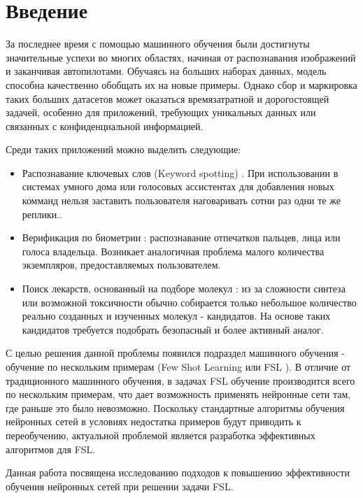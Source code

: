 \section{Введение}
\label{sec:Chapter0} 

\par
За последнее время с помощью машинного обучения были достигнуты значительные успехи во многих областях, начиная от распознавания изображений и заканчивая автопилотами.  Обучаясь на больших наборах данных, модель способна качественно обобщать их на новые примеры. Однако сбор и маркировка таких больших датасетов может оказаться времязатратной и дорогостоящей задачей, особенно для приложений, требующих уникальных данных или связанных с конфиденциальной информацией.

Среди таких приложений можно выделить следующие:
\begin{itemize}
    \item Распознавание ключевых слов (Keyword spotting) \cite{FSLKeywordSpotting}. При использовании в системах умного дома или голосовых ассистентах для добавления новых комманд нельзя заставить пользователя наговаривать сотни раз одни те же реплики..
    \item Верификация по биометрии \cite{FSLBiometricVerification}: распознавание отпечатков пальцев, лица или голоса владельца. Возникает аналогичная проблема малого количества экземпляров, предоставляемых пользователем.
    \item Поиск лекарств, основанный на подборе молекул \cite{FSLDrugDiscovery}: из за сложности синтеза или возможной токсичности обычно собирается только небольшое количество реально созданных и изученных молекул - кандидатов. На основе таких кандидатов требуется подобрать безопасный и более активный аналог.
\end{itemize}

\par
С целью решения данной проблемы появился подраздел машинного обучения - обучение по нескольким примерам (Few Shot Learning или FSL \cite{FSLsurvey}). В отличие от традиционного машинного обучения, в задачах FSL обучение производится всего по нескольким примерам, что дает возможность применять нейронные сети там, где раньше это было невозможно. Поскольку стандартные алгоритмы обучения нейронных сетей в условиях недостатка примеров будут приводить к переобучению, актуальной проблемой является разработка эффективных алгоритмов для FSL.

\par
Данная работа посвящена исследованию подходов к повышению эффективности обучения нейронных сетей при решении задачи FSL. 
